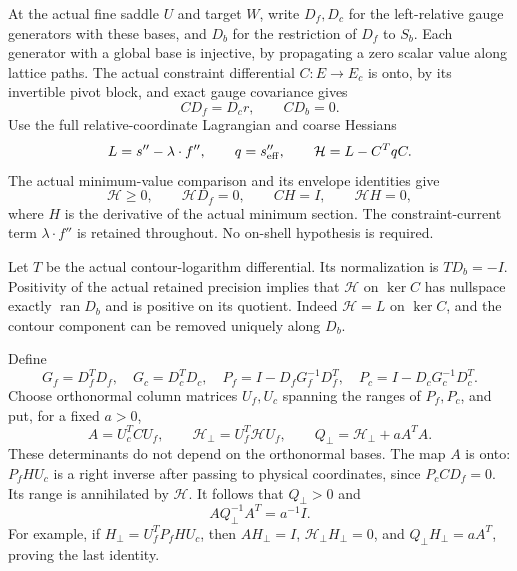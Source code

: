 \documentclass[11pt]{article}
\theoremstyle{remark}
\begin{document}
At the actual fine saddle $U$ and target $W$, write $D_f,D_c$ for the
left-relative gauge generators with these bases, and $D_b$ for the
restriction of $D_f$ to $S_b$. Each generator with a global base is
injective, by propagating a zero scalar value along lattice paths.
The actual constraint differential $C:E\to E_c$ is onto, by its
invertible pivot block, and exact gauge covariance gives
\begin{equation}
 CD_f=D_c r,\qquad CD_b=0.\label{pqd-covariance}
\end{equation}
Use the full relative-coordinate Lagrangian and coarse Hessians
\begin{equation}
 L=s''-\lambda\cdot f'',\qquad q=s_{\rm eff}'',\qquad
 \mathcal H=L-C^TqC.\label{pqd-residual}
\end{equation}
The actual minimum-value comparison and its envelope identities give
\begin{equation}
 \mathcal H\ge0,\qquad \mathcal H D_f=0,\qquad
 CH=I,\qquad \mathcal H H=0,\label{pqd-residual-identities}
\end{equation}
where $H$ is the derivative of the actual minimum section.
The constraint-current term $\lambda\cdot f''$ is retained throughout.
No on-shell hypothesis is required.

Let $T$ be the actual contour-logarithm differential. Its normalization
is $TD_b=-I$. Positivity of the actual retained precision implies that
$\mathcal H$ on $\ker C$ has nullspace exactly $\operatorname{ran}D_b$
and is positive on its quotient. Indeed $\mathcal H=L$ on $\ker C$,
and the contour component can be removed uniquely along $D_b$.

Define
\begin{equation}
 G_f=D_f^TD_f,\quad G_c=D_c^TD_c,\quad
 P_f=I-D_fG_f^{-1}D_f^T,\quad
 P_c=I-D_cG_c^{-1}D_c^T.\label{pqd-projections}
\end{equation}
Choose orthonormal column matrices $U_f,U_c$ spanning the ranges of
$P_f,P_c$, and put, for a fixed $a>0$,
\begin{equation}
 A=U_c^TCU_f,\qquad \mathcal H_\perp=U_f^T\mathcal H U_f,
 \qquad Q_\perp=\mathcal H_\perp+aA^TA.
 \label{pqd-physical-precision}
\end{equation}
These determinants do not depend on the orthonormal bases.
The map $A$ is onto: $P_fHU_c$ is a right inverse after passing to
physical coordinates, since $P_cCD_f=0$. Its range is annihilated by
$\mathcal H$. It follows that $Q_\perp>0$ and
\begin{equation}
 A Q_\perp^{-1}A^T=a^{-1}I.\label{pqd-compression}
\end{equation}
For example, if $H_\perp=U_f^TP_fHU_c$, then
$AH_\perp=I$, $\mathcal H_\perp H_\perp=0$, and
$Q_\perp H_\perp=aA^T$, proving the last identity.
\end{document}
